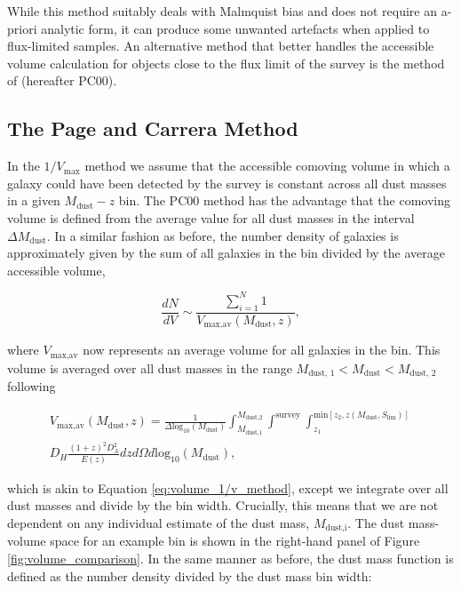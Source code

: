 While this method suitably deals with Malmquist bias and does not require an a-priori analytic form, it can produce some unwanted artefacts when applied to flux-limited samples. An alternative method that better handles the accessible volume calculation for objects close to the flux limit of the survey is the method of \citealt{Page_2000} (hereafter PC00).

\subsection{The Page and Carrera Method}

In the $1/V_{\textrm{max}}$ method we assume that the accessible comoving volume in which a galaxy could have been detected by the survey is constant across all dust masses in a given $M_{\textrm{dust}} - z$ bin. The PC00 method has the advantage that the comoving volume is defined from the average value for all dust masses in the interval $\Delta M_{\textrm{dust}}$. In a similar fashion as before, the number density of galaxies is approximately given by the sum of all galaxies in the bin divided by the average accessible volume, 

\begin{equation}
    \frac{dN}{dV} \sim \frac{\sum_{i=1}^N 1}{V_{\textrm{max,av}}(M_{\textrm{dust}},z)},
\label{eq:number_density_pc00_method}
\end{equation}

\noindent where $V_{\textrm{max,av}}$ now represents an average volume for all galaxies in the bin. This volume is averaged over all dust masses in the range $M_{\textrm{dust, 1}} < M_{\textrm{dust}} < M_{\textrm{dust, 2}}$ following

\begin{multline}
    V_{\textrm{max,av}}(M_{\textrm{dust}},z) = \frac{1}{\Delta \textrm{log}_{10}(M_\textrm{dust})}\int_{\scriptscriptstyle M_{\textrm{dust,1}}}^{\scriptscriptstyle M_{\textrm{dust,2}}} \int^{\scriptscriptstyle \textrm{survey}} \int_{\scriptscriptstyle z_1}^{\scriptscriptstyle \textrm{min}[z_2, z(M_{\textrm{dust}},S_{\textrm{lim}})]} \\ D_H \frac{(1+z)^2 D_A^2}{E(z)} dz d\Omega d\textrm{log}_{10}(M_\textrm{dust}),
\label{eq:volume_pc00_method}
\end{multline}

\noindent which is akin to Equation \ref{eq:volume_1/v_method}, except we integrate over all dust masses and divide by the bin width. Crucially, this means that we are not dependent on any individual estimate of the dust mass, $M_{\textrm{dust,i}}$. The dust mass-volume space for an example bin is shown in the right-hand panel of Figure \ref{fig:volume_comparison}. In the same manner as before, the dust mass function is defined as the number density divided by the dust mass bin width:

